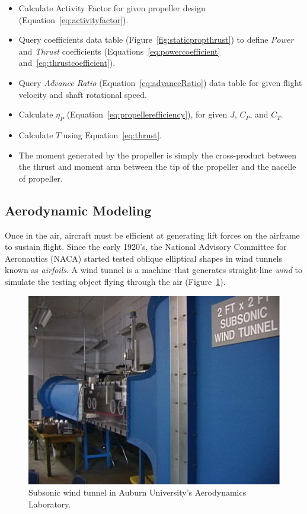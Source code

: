\documentclass[12pt]{report}
\begin{document}
\begin{itemize}
  \item[1.] Calculate Activity Factor for given propeller design (Equation~\ref{eq:activityfactor}).
  \item[2.] Query coefficients data table (Figure~\ref{fig:staticpropthrust}) to define \textit{Power} and \textit{Thrust} coefficients (Equations~\ref{eq:powercoefficient} and~\ref{eq:thrustcoefficient}).
  \item[3.] Query \textit{Advance Ratio} (Equation~\ref{eq:advanceRatio}) data table for given flight velocity and shaft rotational speed.
  \item[4.] Calculate \( \eta_P \) (Equation~\ref{eq:propellerefficiency}), for given \(J\), \(C_P\), and \(C_T\).
  \item[5.] Calculate \(T\) using Equation~\ref{eq:thrust}.
  \item[6.] The moment generated by the propeller is simply the cross-product between the thrust and moment arm between the tip of the propeller and the nacelle of propeller.
\end{itemize}


\clearpage
\subsection{Aerodynamic Modeling}\label{section:aerodynamic}
Once in the air, aircraft must be efficient at generating lift forces on the airframe to sustain flight. Since the early 1920's, the National Advisory Committee for Aeronautics (NACA) started tested oblique elliptical shapes in wind tunnels known as \textit{airfoils}. A wind tunnel is a machine that generates straight-line \textit{wind} to simulate the testing object flying through the air (Figure~\ref{fig:windtunnel}).

\begin{figure}[!ht]\label{fig:windtunnel}
  \centering
  \includegraphics[width=.75\linewidth]{Figures/opencircuitwindtunnel.jpg}
  \caption{Subsonic wind tunnel in Auburn University's Aerodynamics Laboratory.}
\end{figure}
\end{document}
